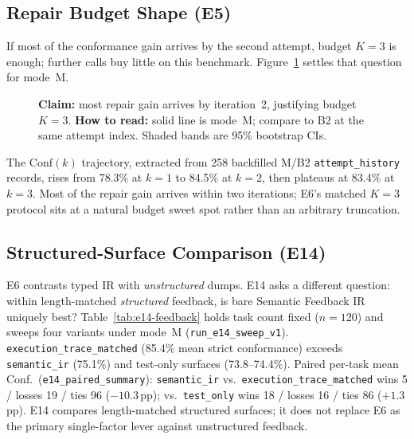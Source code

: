 \begin{table}[H]
  \caption{E6 on second endpoint \texttt{ecnu-max} ($n{=}120$ per variant).}
  \label{tab:feedback-e6-max}
  \centering
\end{table}

\subsection{Repair Budget Shape (E5)}

If most of the conformance gain arrives by the second attempt, budget $K{=}3$
is enough; further calls buy little on this benchmark.
Figure~\ref{fig:convergence} settles that question for mode~M.

\begin{figure}[t]
  \centering
  \caption{\textbf{Claim:} most repair gain arrives by iteration~2, justifying
    budget $K=3$.
    \textbf{How to read:} solid line is mode~M; compare to B2 at the same
    attempt index.  Shaded bands are 95\% bootstrap CIs.}
  \label{fig:convergence}
\end{figure}

The $\mathrm{Conf}(k)$ trajectory, extracted from 258 backfilled M/B2
\texttt{attempt\_history} records, rises from 78.3\% at $k{=}1$ to 84.5\% at
$k{=}2$, then plateaus at 83.4\% at $k{=}3$.
Most of the repair gain arrives within two iterations; E6's matched $K{=}3$
protocol sits at a natural budget sweet spot rather than an
arbitrary truncation.

\subsection{Structured-Surface Comparison (E14)}
\label{sec:results:e14}

E6 contrasts typed IR with \emph{unstructured} dumps.
E14 asks a different question: within length-matched \emph{structured}
feedback, is bare Semantic Feedback IR uniquely best?
Table~\ref{tab:e14-feedback} holds task count fixed ($n{=}120$) and sweeps
four variants under mode~M (\texttt{run\_e14\_sweep\_v1}).
\texttt{execution\_trace\_matched} (85.4\% mean strict conformance) exceeds
\texttt{semantic\_ir} (75.1\%) and test-only surfaces (73.8--74.4\%).
Paired per-task mean Conf.\ (\texttt{e14\_paired\_summary}):
\texttt{semantic\_ir} vs.\ \texttt{execution\_trace\_matched} wins 5 / losses
19 / ties 96 (${-}10.3$\,pp); vs.\ \texttt{test\_only} wins 18 / losses 16 /
ties 86 (${+}1.3$\,pp).
E14 compares length-matched structured surfaces; it does not
replace E6 as the primary single-factor lever against unstructured feedback.

